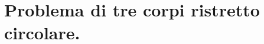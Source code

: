 \section{Problema di tre corpi ristretto circolare.}
\label{ElementiDiMeccanicaCeleste_ProblemaDiTreCorpiRistrettoCircolare}
